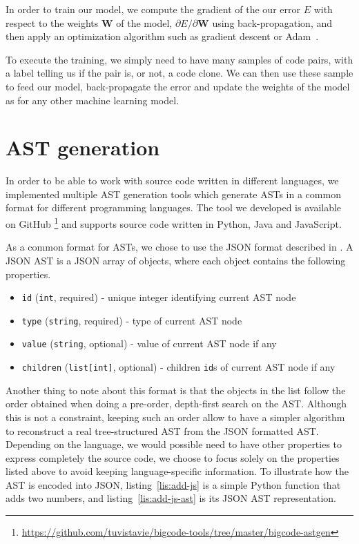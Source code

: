 In order to train our model, we compute the gradient of the our error $E$ with
respect to the weights $\mathbf{W}$ of the model,
$\partial E/\partial\mathbf{W}$ using back-propagation, and then apply an
optimization algorithm such as gradient descent or
Adam~\cite{DBLP:journals/corr/KingmaB14}.

To execute the training, we simply need to have many samples of code pairs,
with a label telling us if the pair is, or not, a code clone. We can then use
these sample to feed our model, back-propagate the error and update the weights
of the model as for any other machine learning model.
\section{\label{sec:ast-generation}AST generation}
In order to be able to work with source code written in different languages,
we implemented multiple AST generation tools which generate ASTs in a common
format for different programming languages. The tool we developed is available
on GitHub%
\footnote{\url{https://github.com/tuvistavie/bigcode-tools/tree/master/bigcode-astgen}}
and supports source code written in Python, Java and JavaScript.

As a common format for ASTs, we chose to use the JSON format described in
\cite{Raychev:2016:LPN:2837614.2837671}. A JSON AST is a JSON array of objects,
where each object contains the following properties.

\begin{itemize}
\item \lstinline{id} (\lstinline{int}, required) -  unique integer identifying
  current AST node
\item \lstinline{type} (\lstinline{string}, required) - type of current AST node
\item \lstinline{value} (\lstinline{string}, optional) - value of current AST
  node if any
\item \lstinline{children} (\lstinline{list[int]}, optional) - children
  \lstinline{id}s of current AST node if any
\end{itemize}
%
Another thing to note about this format is that the objects in the list follow
the order obtained when doing a pre-order, depth-first search on the AST.
Although this is not a constraint, keeping such an order allow to have a simpler
algorithm to reconstruct a real tree-structured AST from the JSON formatted AST.
Depending on the language, we would possible need to have other
properties to express completely the source code, we choose to focus solely on
the properties listed above to avoid keeping language-specific information. To
illustrate how the AST is encoded into JSON, listing~\ref{lis:add-js} is a
simple Python function that adds two numbers, and listing~\ref{lis:add-js-ast}
is its JSON AST representation.

